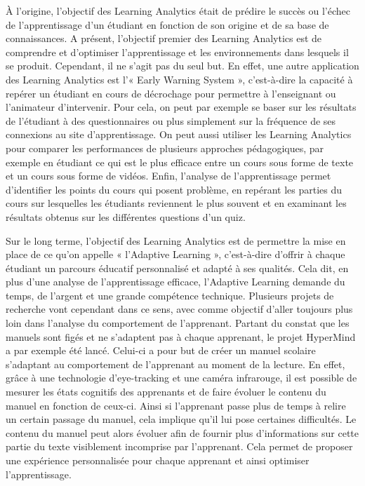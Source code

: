            À l’origine, l’objectif des Learning Analytics était de prédire le succès ou l’échec de l’apprentissage d’un étudiant en fonction de son origine et de sa base de connaissances. A présent, l’objectif premier des Learning Analytics est de comprendre et d’optimiser l’apprentissage et les environnements dans lesquels il se produit. Cependant, il ne s’agit pas du seul but. En effet, une autre application des Learning Analytics est l’« Early Warning System », c’est-à-dire la capacité à repérer un étudiant en cours de décrochage pour permettre à l’enseignant ou l’animateur d’intervenir. Pour cela, on peut par exemple se baser sur les résultats de l’étudiant à des questionnaires ou plus simplement sur la fréquence de ses connexions au site d’apprentissage. On peut aussi utiliser les Learning Analytics pour comparer les performances de plusieurs approches pédagogiques, par exemple en étudiant ce qui est le plus efficace entre un cours sous forme de texte et un cours sous forme de vidéos. Enfin, l’analyse de l’apprentissage permet d’identifier les points du cours qui posent problème, en repérant les parties du cours sur lesquelles les étudiants reviennent le plus souvent et en examinant les résultats obtenus sur les différentes questions d’un quiz.
       
           Sur le long terme, l’objectif des Learning Analytics est de permettre la mise en place de ce qu’on appelle « l’Adaptive Learning », c’est-à-dire d’offrir à chaque étudiant un parcours éducatif personnalisé et adapté à ses qualités. Cela dit, en plus d’une analyse de l’apprentissage efficace, l’Adaptive Learning demande du temps, de l’argent et une grande compétence technique. Plusieurs projets de recherche vont cependant dans ce sens, avec comme objectif d’aller toujours plus loin dans l’analyse du comportement de l’apprenant. Partant du constat que les manuels sont figés et ne s’adaptent pas à chaque apprenant, le projet HyperMind a par exemple été lancé. Celui-ci a pour but de créer un manuel scolaire s’adaptant au comportement de l’apprenant au moment de la lecture. En effet, grâce à une technologie d'eye-tracking et une caméra infrarouge, il est possible de mesurer les états cognitifs des apprenants et de faire évoluer le contenu du manuel en fonction de ceux-ci. Ainsi si l’apprenant passe plus de temps à relire un certain passage du manuel, cela implique qu’il lui pose certaines difficultés. Le contenu du manuel peut alors évoluer afin de fournir plus d’informations sur cette partie du texte visiblement incomprise par l’apprenant. Cela permet de proposer une expérience personnalisée pour chaque apprenant et ainsi optimiser l’apprentissage.
       
